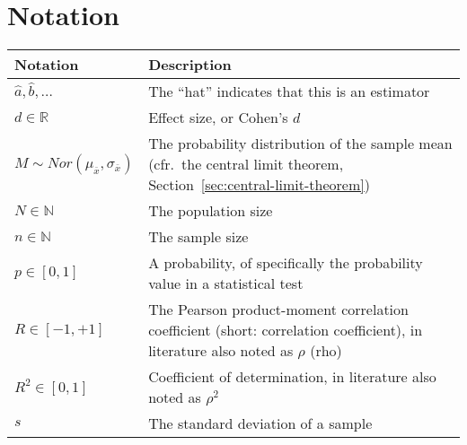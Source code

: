 \chapter{Notation}
\label{app:notation}

\begin{table}
  \centering
  \begin{tabular}{p{}p{}}
  	\toprule
  	\textbf{Notation}                                       & \textbf{Description}                                                                                                              \\
  	\midrule
  	$\widehat{a}, \widehat{b}, \ldots$                      & The ``hat'' indicates that this is an estimator                                                                                   \\
  	$d \in \mathbb{R}$                                      & Effect size, or Cohen's $d$                                                                                                       \\
  	$M \sim Nor(\mu_{\overline{x}}, \sigma_{\overline{x}})$ & The probability distribution of the sample mean (cfr.~the central limit theorem, Section~\ref{sec:central-limit-theorem})         \\
  	$N \in \mathbb{N}$                                      & The population size                                                                                                               \\
  	$n \in \mathbb{N}$                                      & The sample size                                                                                                                   \\
  	$p \in [0, 1]$                                          & A probability, of specifically the probability value in a statistical test                                                        \\
  	$R \in [-1, +1]$                                        & The Pearson product-moment correlation coefficient (short: correlation coefficient), in literature also noted as $\rho$ (rho)     \\
  	$R^2 \in [0, 1]$                                        & Coefficient of determination, in literature also noted as $\rho^2$                                                                \\
  	$s$                                                     & The standard deviation of a sample                                                                                                \\

\end{tabular}
\end{table}
